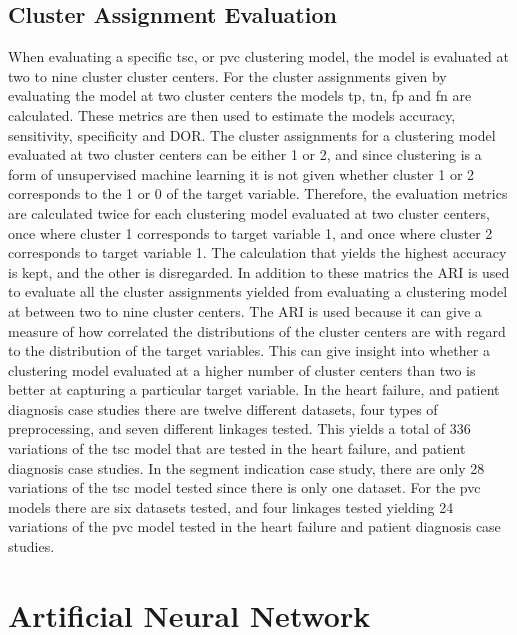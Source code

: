 \subsection{Cluster Assignment Evaluation}

When evaluating a specific \acrshort{tsc}, or \acrshort{pvc} clustering model, the model is evaluated at two to nine cluster cluster centers. For the cluster assignments given by evaluating the model at two cluster centers the models \acrshort{tp}, \acrshort{tn}, \acrshort{fp} and \acrshort{fn} are calculated. These metrics are then used to estimate the models accuracy, sensitivity, specificity and DOR. The cluster assignments for a clustering model evaluated at two cluster centers can be either 1 or 2, and since clustering is a form of unsupervised machine learning it is not given whether cluster 1 or 2 corresponds to the 1 or 0 of the target variable. Therefore, the evaluation metrics are calculated twice for each clustering model evaluated at two cluster centers, once where cluster 1 corresponds to target variable 1, and once where cluster 2 corresponds to target variable 1. The calculation that yields the highest accuracy is kept, and the other is disregarded. In addition to these matrics the ARI is used to evaluate all the cluster assignments yielded from evaluating a clustering model at between two to nine cluster centers. The ARI is used because it can give a measure of how correlated the distributions of the cluster centers are with regard to the distribution of the target variables. This can give insight into whether a clustering model evaluated at a higher number of cluster centers than two is better at capturing a particular target variable. In the heart failure, and patient diagnosis case studies there are twelve different datasets, four types of preprocessing, and seven different linkages tested. This yields a total of 336 variations of the \acrshort{tsc} model that are tested in the heart failure, and patient diagnosis case studies. In the segment indication case study, there are only 28 variations of the \acrshort{tsc} model tested since there is only one dataset. For the \acrshort{pvc} models there are six datasets tested, and four linkages tested yielding 24 variations of the \acrshort{pvc} model tested in the heart failure and patient diagnosis case studies.

\section{Artificial Neural Network} \label{sec:meth_nn}

